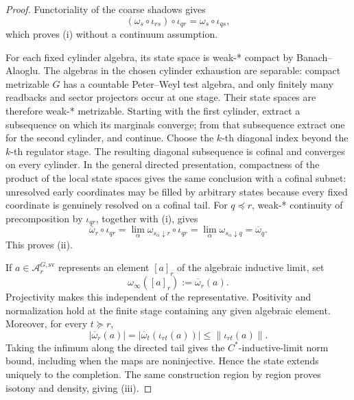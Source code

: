 \begin{proof}
Functoriality of the coarse shadows gives
\[
(\omega_s\circ\iota_{rs})\circ\iota_{qr}
=\omega_s\circ\iota_{qs},
\]
which proves \textup{(i)} without a continuum assumption.

For each fixed cylinder algebra, its state space is weak-* compact by Banach--Alaoglu. The
algebras in the chosen cylinder exhaustion are separable: compact metrizable \(G\) has a
countable Peter--Weyl test algebra, and only finitely many readbacks and sector projectors occur at
one stage. Their state spaces are therefore weak-* metrizable. Starting with the first cylinder,
extract a subsequence on which its marginals converge; from that subsequence extract one
for the second cylinder, and continue. Choose the \(k\)-th diagonal index beyond the \(k\)-th
regulator stage. The resulting diagonal subsequence is cofinal and converges on every cylinder. In
the general directed presentation, compactness of the product of the local state spaces gives the
same conclusion with a cofinal subnet: unresolved early coordinates may be filled by arbitrary
states because every fixed coordinate is genuinely resolved on a cofinal tail. For
\(q\preceq r\), weak-* continuity of precomposition
by \(\iota_{qr}\), together with \textup{(i)}, gives
\[
\overline\omega_r\circ\iota_{qr}
=\lim_\alpha\omega_{s_\alpha\downarrow r}\circ\iota_{qr}
=\lim_\alpha\omega_{s_\alpha\downarrow q}
=\overline\omega_q.
\]
This proves \textup{(ii)}.

If \(a\in\mathcal A_r^{G,\mathrm{sv}}\) represents an element \([a]_r\) of the algebraic
inductive limit, set
\[
\omega_\infty([a]_r):=\overline\omega_r(a).
\]
Projectivity makes this independent of the representative. Positivity and normalization hold at
the finite stage containing any given algebraic element. Moreover, for every \(t\succeq r\),
\[
|\overline\omega_r(a)|
=|\overline\omega_t(\iota_{rt}(a))|
\le\|\iota_{rt}(a)\|.
\]
Taking the infimum along the directed tail gives the \(C^*\)-inductive-limit norm bound, including
when the maps are noninjective. Hence the state extends uniquely to the completion. The
same construction region by region proves isotony and density, giving \textup{(iii)}.


\end{proof}
